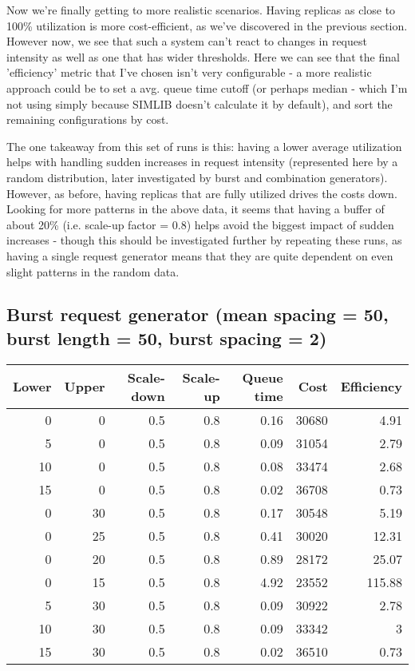 \documentclass{scrartcl}
\begin{document}
Now we're finally getting to more realistic scenarios. Having replicas as close
to 100\% utilization is more cost-efficient, as we've discovered in the previous
section. However now, we see that such a system can't react to changes in
request intensity as well as one that has wider thresholds. Here we can see that
the final 'efficiency' metric that I've chosen isn't very configurable - a more
realistic approach could be to set a avg. queue time cutoff (or perhaps median -
which I'm not using simply because SIMLIB doesn't calculate it by default), and
sort the remaining configurations by cost.

The one takeaway from this set of runs is this: having a lower average
utilization helps with handling sudden increases in request intensity
(represented here by a random distribution, later investigated by burst and
combination generators). However, as before, having replicas that are fully
utilized drives the costs down. Looking for more patterns in the above data, it
seems that having a buffer of about 20\% (i.e. scale-up factor = 0.8) helps avoid
the biggest impact of sudden increases - though this should be investigated
further by repeating these runs, as having a single request generator means that
they are quite dependent on even slight patterns in the random data.


\subsection{Burst request generator (mean spacing = 50, burst length = 50, burst spacing = 2)}
\label{sec-5-3}
\begin{center}
\begin{tabular}{rrrrrrr}
Lower & Upper & Scale-down & Scale-up & Queue time & Cost & Efficiency\\
\hline
0 & 0 & 0.5 & 0.8 & 0.16 & 30680 & 4.91\\
5 & 0 & 0.5 & 0.8 & 0.09 & 31054 & 2.79\\
10 & 0 & 0.5 & 0.8 & 0.08 & 33474 & 2.68\\
15 & 0 & 0.5 & 0.8 & 0.02 & 36708 & 0.73\\
0 & 30 & 0.5 & 0.8 & 0.17 & 30548 & 5.19\\
0 & 25 & 0.5 & 0.8 & 0.41 & 30020 & 12.31\\
0 & 20 & 0.5 & 0.8 & 0.89 & 28172 & 25.07\\
0 & 15 & 0.5 & 0.8 & 4.92 & 23552 & 115.88\\
5 & 30 & 0.5 & 0.8 & 0.09 & 30922 & 2.78\\
10 & 30 & 0.5 & 0.8 & 0.09 & 33342 & 3\\
15 & 30 & 0.5 & 0.8 & 0.02 & 36510 & 0.73\\
\end{tabular}
\end{center}
\end{document}
